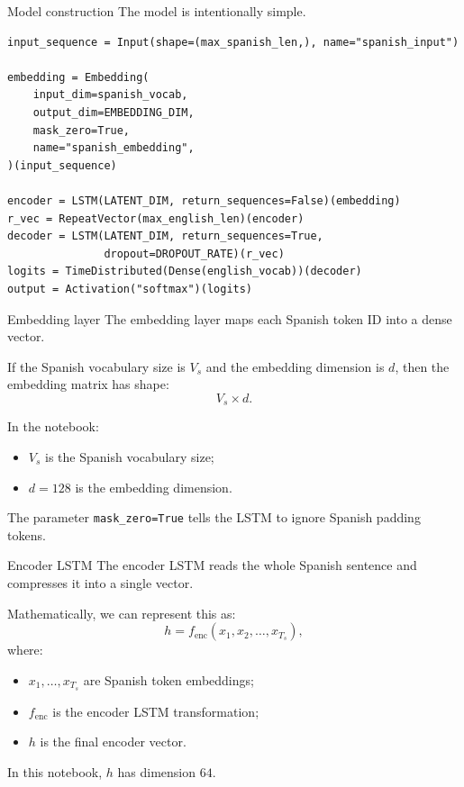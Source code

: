 \documentclass[aspectratio=169]{beamer}
\begin{document}
\begin{frame}[fragile]{Model construction}
The model is intentionally simple.

\begin{lstlisting}
input_sequence = Input(shape=(max_spanish_len,), name="spanish_input")

embedding = Embedding(
    input_dim=spanish_vocab,
    output_dim=EMBEDDING_DIM,
    mask_zero=True,
    name="spanish_embedding",
)(input_sequence)

encoder = LSTM(LATENT_DIM, return_sequences=False)(embedding)
r_vec = RepeatVector(max_english_len)(encoder)
decoder = LSTM(LATENT_DIM, return_sequences=True,
               dropout=DROPOUT_RATE)(r_vec)
logits = TimeDistributed(Dense(english_vocab))(decoder)
output = Activation("softmax")(logits)
\end{lstlisting}
\end{frame}
%
%
\begin{frame}[fragile]{Embedding layer}
The embedding layer maps each Spanish token ID into a dense vector.

\vspace{0.3cm}
If the Spanish vocabulary size is $V_s$ and the embedding dimension is $d$, then the embedding matrix has shape:
\[
    V_s \times d.
\]

\vspace{0.3cm}
In the notebook:
\begin{itemize}
    \item $V_s$ is the Spanish vocabulary size;
    \item $d = 128$ is the embedding dimension.
\end{itemize}

The parameter \texttt{mask\_zero=True} tells the LSTM to ignore Spanish padding tokens.
\end{frame}
%
%
\begin{frame}[fragile]{Encoder LSTM}
The encoder LSTM reads the whole Spanish sentence and compresses it into a single vector.

\vspace{0.3cm}
Mathematically, we can represent this as:
\[
    h = f_{\text{enc}}(x_1, x_2, \ldots, x_{T_s}),
\]
where:
\begin{itemize}
    \item $x_1, \ldots, x_{T_s}$ are Spanish token embeddings;
    \item $f_{\text{enc}}$ is the encoder LSTM transformation;
    \item $h$ is the final encoder vector.
\end{itemize}

\vspace{0.2cm}
In this notebook, $h$ has dimension $64$.
\end{frame}
\end{document}
